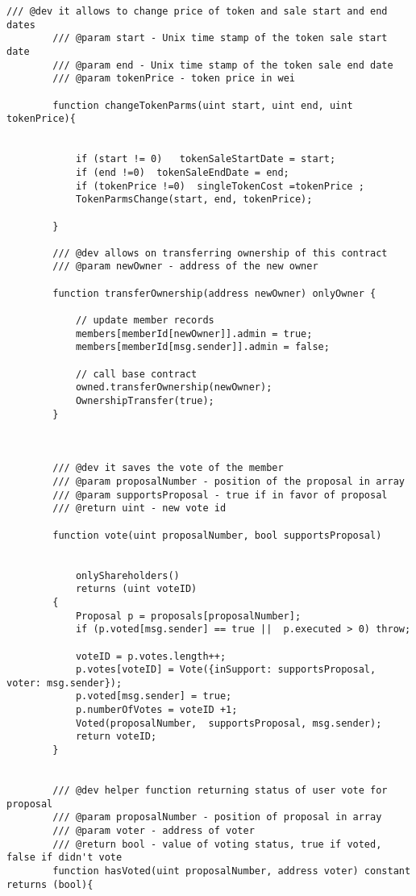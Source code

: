 \documentclass{article}
\begin{document}
\begin{lstlisting}[style=MyCStyle]
        /// @dev it allows to change price of token and sale start and end dates
        /// @param start - Unix time stamp of the token sale start date
        /// @param end - Unix time stamp of the token sale end date
        /// @param tokenPrice - token price in wei

        function changeTokenParms(uint start, uint end, uint tokenPrice){


            if (start != 0)   tokenSaleStartDate = start;
            if (end !=0)  tokenSaleEndDate = end;
            if (tokenPrice !=0)  singleTokenCost =tokenPrice ;
            TokenParmsChange(start, end, tokenPrice);

        }

        /// @dev allows on transferring ownership of this contract
        /// @param newOwner - address of the new owner

        function transferOwnership(address newOwner) onlyOwner {

            // update member records
            members[memberId[newOwner]].admin = true;
            members[memberId[msg.sender]].admin = false;

            // call base contract
            owned.transferOwnership(newOwner);
            OwnershipTransfer(true);
        }



        /// @dev it saves the vote of the member
        /// @param proposalNumber - position of the proposal in array
        /// @param supportsProposal - true if in favor of proposal
        /// @return uint - new vote id

        function vote(uint proposalNumber, bool supportsProposal)


            onlyShareholders()
            returns (uint voteID)
        {
            Proposal p = proposals[proposalNumber];
            if (p.voted[msg.sender] == true ||  p.executed > 0) throw;

            voteID = p.votes.length++;
            p.votes[voteID] = Vote({inSupport: supportsProposal, voter: msg.sender});
            p.voted[msg.sender] = true;
            p.numberOfVotes = voteID +1;
            Voted(proposalNumber,  supportsProposal, msg.sender);
            return voteID;
        }


        /// @dev helper function returning status of user vote for proposal
        /// @param proposalNumber - position of proposal in array
        /// @param voter - address of voter
        /// @return bool - value of voting status, true if voted, false if didn't vote
        function hasVoted(uint proposalNumber, address voter) constant returns (bool){


\end{lstlisting}
\end{document}
